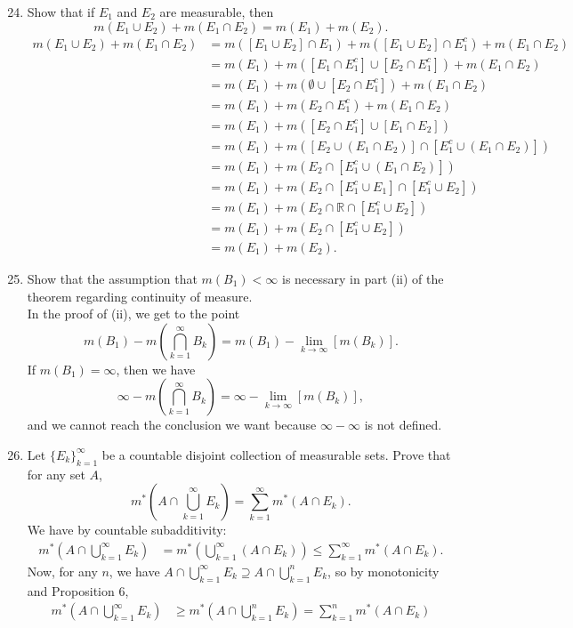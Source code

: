\begin{enumerate}
	\setcounter{enumi}{23}
	\item Show that if $E_1$ and $E_2$ are measurable, then
	\[
		m(E_1\cup E_2)+m(E_1\cap E_2) = m(E_1)+m(E_2).	
	\]
	\begin{align*}
		m(E_1\cup E_2)+m(E_1\cap E_2)&=m([E_1\cup E_2]\cap E_1)+m([E_1\cup E_2]\cap E_1^c)+m(E_1\cap E_2)\\
		&=m(E_1)+m([E_1\cap E_1^c]\cup[E_2\cap E_1^c])+m(E_1\cap E_2)\\
		&=m(E_1)+m(\emptyset\cup[E_2\cap E_1^c])+m(E_1\cap E_2)\\
		&=m(E_1)+m(E_2\cap E_1^c)+m(E_1\cap E_2)\\
		&=m(E_1)+m([E_2\cap E_1^c]\cup[E_1\cap E_2])\\
		&=m(E_1)+m([E_2\cup(E_1\cap E_2)]\cap [E_1^c\cup(E_1\cap E_2)])\\
		&=m(E_1)+m(E_2\cap [E_1^c\cup(E_1\cap E_2)])\\
		&=m(E_1)+m(E_2\cap [E_1^c\cup E_1]\cap [E_1^c\cup E_2])\\
		&=m(E_1)+m(E_2\cap \mathbb{R} \cap [E_1^c\cup E_2])\\
		&=m(E_1)+m(E_2\cap [E_1^c\cup E_2])\\
		&=m(E_1)+m(E_2).
	\end{align*}
	\item Show that the assumption that $m(B_1)<\infty$ is necessary in part (ii) of the theorem regarding continuity of measure.\\
	In the proof of (ii), we get to the point 
	\[
		m(B_1)-m(\bigcap_{k=1}^\infty  B_k)=m(B_1)-\lim_{k\to\infty}[m( B_k)].
	\]
	If $m(B_1)=\infty$, then we have
	\[
		\infty-m(\bigcap_{k=1}^\infty  B_k)=\infty-\lim_{k\to\infty}[m( B_k)],
	\]
	and we cannot reach the conclusion we want because $\infty-\infty$ is not defined.
	\item Let $\{E_k\}_{k=1}^\infty$ be a countable disjoint collection of measurable sets. Prove that for any set $A$, 
	\[
		m^*(A\cap\bigcup_{k=1}^\infty E_k)=\sum_{k=1}^\infty m^*(A\cap E_k).	
	\]
	We have by countable subadditivity:
	\begin{align*}
		m^*(A\cap\bigcup_{k=1}^\infty E_k)&=m^*(\bigcup_{k=1}^\infty (A\cap E_k))\le\sum_{k=1}^\infty m^*(A\cap E_k).
	\end{align*}
	Now, for any $n$, we have $A\cap\bigcup_{k=1}^\infty E_k\supseteq A\cap\bigcup_{k=1}^n E_k$, so by monotonicity and Proposition 6,
	\begin{align*}
		m^*(A\cap\bigcup_{k=1}^\infty E_k)&\ge m^*(A\cap\bigcup_{k=1}^n E_k)=\sum_{k=1}^n m^*(A\cap E_k)

\end{align*}
\end{enumerate}
